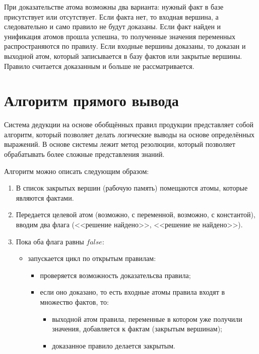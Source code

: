 \documentclass{bmstu}
\begin{document}
При доказательстве атома возможны два варианта: нужный факт в базе присутствует или отсутствует. Если факта нет, то входная вершина, а следовательно и само правило не будут доказаны. Если факт найден и унификация атомов прошла успешна, то полученные значения переменных распространяются по правилу. Если входные вершины доказаны, то доказан и выходной атом, который записывается в базу фактов или закрытые вершины. Правило считается доказанным и больше не рассматривается.

\section{Алгоритм прямого вывода}

Система дедукции на основе обобщённых правил продукции представляет собой алгоритм, который позволяет делать логические выводы на основе определённых выражений. В основе системы лежит метод резолюции, который позволяет обрабатывать более сложные представления знаний.

Алгоритм можно описать следующим образом:
\begin{enumerate}
    \item В список закрытых вершин (рабочую память) помещаются атомы, которые являются фактами.
    \item Передается целевой атом (возможно, с переменной, возможно, с константой), вводим два флага (<<решение найдено>>, <<решение не найдено>>).
    \item Пока оба флага равны $false$:
    \begin{itemize}
        \item запускается цикл по открытым правилам:
        \begin{itemize}
            \item проверяется возможность доказательсва правила;
            \item если оно доказано, то есть входные атомы правила входят в множество фактов, то:
            \begin{itemize}
                \item выходной атом правила, переменные в котором уже получили значения, добавляется к фактам (закрытым вершинам);
                \item доказанное правило делается закрытым.
            \end{itemize}
        \end{itemize}
    \end{itemize}
\end{enumerate}
\end{document}
